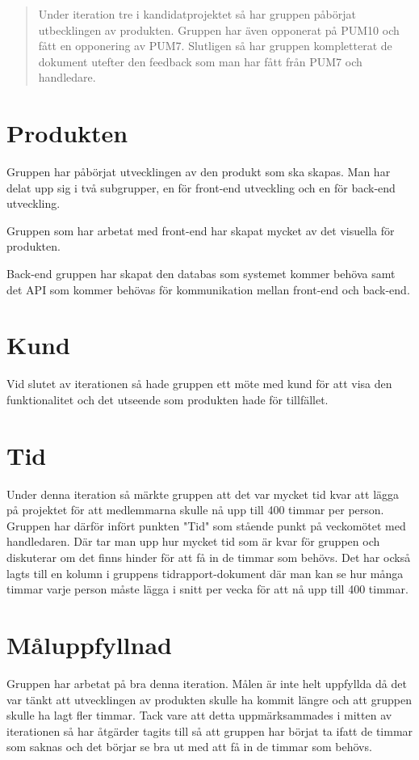 \documentclass[a4paper,10pt, twoside]{article}
\begin{document}


\clearpage
\begin{abstract}
\noindent Under iteration tre i kandidatprojektet så har gruppen påbörjat utbecklingen av produkten. Gruppen har även opponerat på PUM10 och fått en opponering av PUM7.
Slutligen så har gruppen kompletterat de dokument utefter den feedback som man har fått från PUM7 och handledare.
\end{abstract}
\clearpage

\section{Produkten}
\label{sec:Produkten}
Gruppen har påbörjat utvecklingen av den produkt som ska skapas. Man har delat upp sig i två subgrupper, en för front-end utveckling och en för back-end utveckling.

Gruppen som har arbetat med front-end har skapat mycket av det visuella för produkten.

Back-end gruppen har skapat den databas som systemet kommer behöva samt det API som kommer behövas för kommunikation mellan front-end och back-end.

\section{Kund}
Vid slutet av iterationen så hade gruppen ett möte med kund för att visa den funktionalitet och det utseende som produkten hade för tillfället.

\section{Tid}
Under denna iteration så märkte gruppen att det var mycket tid kvar att lägga på projektet för att medlemmarna skulle nå upp till 400 timmar per person. Gruppen har därför infört punkten "Tid" som stående punkt på veckomötet med handledaren. Där tar man upp hur mycket tid som är kvar för gruppen och diskuterar om det finns hinder för att få in de timmar som behövs.
Det har också lagts till en kolumn i gruppens tidrapport-dokument där man kan se hur många timmar varje person måste lägga i snitt per vecka för att nå upp till 400 timmar.

\section{Måluppfyllnad}
Gruppen har arbetat på bra denna iteration. Målen är inte helt uppfyllda då det var tänkt att utvecklingen av produkten skulle ha kommit längre och att gruppen skulle ha lagt fler timmar. Tack vare att detta uppmärksammades i mitten av iterationen så har åtgärder tagits till så att gruppen har börjat ta ifatt de timmar som saknas och det börjar se bra ut med att få in de timmar som behövs.
\end{document}
